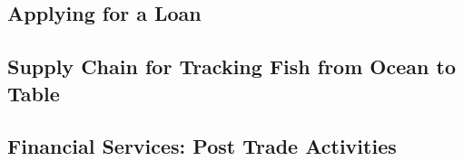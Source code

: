 \subsection{Applying for a Loan}


\subsection{Supply Chain for Tracking Fish from Ocean to Table}


\subsection{Financial Services: Post Trade Activities}



